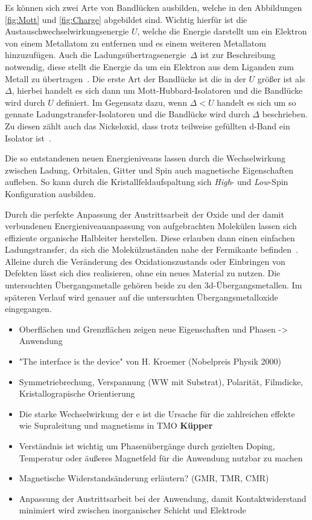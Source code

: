         Es können sich zwei Arte von Bandlücken ausbilden, welche in den Abbildungen \ref{fig:Mott} und \ref{fig:Charge} abgebildet sind.
        Wichtig hierfür ist die Austauschwechselwirkungsenergie $U$, welche die Energie darstellt um ein Elektron von einem Metallatom zu entfernen und es einem weiteren Metallatom hinzuzufügen.
        Auch die Ladungsübertragsenergie~$\Delta$ ist zur Beschreibung notwendig, diese stellt die Energie da um ein Elektron aus dem Liganden zum Metall zu übertragen~\cite{stohr_magnetism_2006}.
        Die erste Art der Bandlücke ist die in der $U$ größer ist als $\Delta$, hierbei handelt es sich dann um Mott-Hubbard-Isolatoren und die Bandlücke wird durch $U$ definiert.
        Im Gegensatz dazu, wenn $\Delta < U$ handelt es sich um so gennate Ladungstransfer-Isolatoren und die Bandlücke wird durch $\Delta$ beschrieben.
        Zu diesen zählt auch das Nickeloxid, dass trotz teilweise gefüllten d-Band ein Isolator ist~\cite{IF_5}.
        
        Die so entstandenen neuen Energieniveaus lassen durch die Wechselwirkung zwischen Ladung, Orbitalen, Gitter und Spin auch magnetische Eigenschaften aufleben.
        So kann durch die Kristallfeldaufspaltung sich \textit{High}- und \textit{Low}-Spin Konfiguration ausbilden.

        Durch die perfekte Anpassung der Austrittsarbeit der Oxide und der damit verbundenen Energieniveauanpassung von aufgebrachten Molekülen lassen sich effiziente organische Halbleiter herstellen.
        Diese erlauben dann einen einfachen Ladungstransfer, da sich die Molekülzuständen nahe der Fermikante befinden~\cite{IF_3}.
        Alleine durch die Veränderung des Oxidationszustands oder Einbringen von Defekten lässt sich dies realisieren, ohne ein neues Material zu nutzen.
        Die untersuchten Übergangsmetalle gehören beide zu den 3d-Übergangsmetallen.
        Im späteren Verlauf wird genauer auf die untersuchten Übergangsmetalloxide eingegangen.

        \begin{itemize}
            \item Oberflächen und Grenzflächen zeigen neue Eigenschaften und Phasen -> Anwendung 
            \item "The interface is the device" von H. Kroemer (Nobelpreis Physik 2000)
            \item Symmetriebrechung, Verspannung (WW mit Substrat), Polarität, Filmdicke, Kristallograpische Orientierung
            \item Die starke Wechselwirkung der e ist die Ursache für die zahlreichen effekte wie Supraleitung und magnetisms in TMO \textbf{Küpper}
            \item Verständnis ist wichtig um Phasenübergänge durch gezielten Doping, Temperatur oder äußeres Magnetfeld für die Anwendung nutzbar zu machen
            \item Magnetische Widerstandsänderung erläutern? (GMR, TMR, CMR)
            \item Anpassung der Austrittsarbeit bei der Anwendung, damit Kontaktwiderstand minimiert wird zwischen inorganischer Schicht und Elektrode \cite{IF_11, NiO_40}
        \end{itemize}

